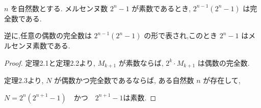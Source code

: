 \begin{theorem}\label{even_and_perfect_iff}
\leanok{}~\

\( n \) を自然数とする.
メルセンヌ数 \( 2^n - 1 \) が素数であるとき, \( 2^{n-1}(2^n - 1) \) は完全数である.

逆に,任意の偶数の完全数は \( 2^{n-1}(2^n - 1) \) の形で表され,このとき \( 2^n - 1 \) はメルセンヌ素数である.

\end{theorem}

\begin{proof}
定理2.1と定理2.2より, \(M_{k+1}\) が素数ならば, \(2^k \cdot M_{k+1}\) は偶数の完全数.

定理2.3より, \(N\) が偶数かつ完全数であるならば, ある自然数 \(n\) が存在して,

\(N = 2^n(2^{n+1} - 1) \quad \text{かつ} \quad 2^{n+1} - 1 \text{は素数}\).
\end{proof}
